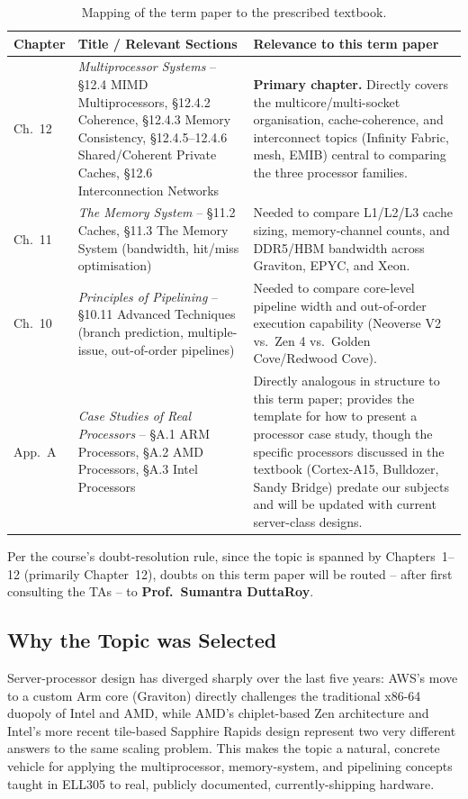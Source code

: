 \documentclass[11pt,a4paper]{article}
\begin{document}
\begin{table}[h]
\centering
\begin{tabular}{@{}p{2.6cm}p{5.6cm}p{6.4cm}@{}}
\toprule
\textbf{Chapter} & \textbf{Title / Relevant Sections} & \textbf{Relevance to this term paper} \\
\midrule
Ch.\ 12 & \emph{Multiprocessor Systems} --
  \S12.4 MIMD Multiprocessors, \S12.4.2 Coherence, \S12.4.3 Memory Consistency,
  \S12.4.5--12.4.6 Shared/Coherent Private Caches, \S12.6 Interconnection Networks &
  \textbf{Primary chapter.} Directly covers the multicore/multi-socket organisation,
  cache-coherence, and interconnect topics (Infinity Fabric, mesh, EMIB) central to comparing
  the three processor families. \\
Ch.\ 11 & \emph{The Memory System} --
  \S11.2 Caches, \S11.3 The Memory System (bandwidth, hit/miss optimisation) &
  Needed to compare L1/L2/L3 cache sizing, memory-channel counts, and DDR5/HBM
  bandwidth across Graviton, EPYC, and Xeon. \\
Ch.\ 10 & \emph{Principles of Pipelining} --
  \S10.11 Advanced Techniques (branch prediction, multiple-issue, out-of-order pipelines) &
  Needed to compare core-level pipeline width and out-of-order execution capability
  (Neoverse V2 vs.\ Zen 4 vs.\ Golden Cove/Redwood Cove). \\
App.\ A & \emph{Case Studies of Real Processors} --
  \S A.1 ARM Processors, \S A.2 AMD Processors, \S A.3 Intel Processors &
  Directly analogous in structure to this term paper; provides the template for how to
  present a processor case study, though the specific processors discussed in the textbook
  (Cortex-A15, Bulldozer, Sandy Bridge) predate our subjects and will be updated with current
  server-class designs. \\
\bottomrule
\end{tabular}
\caption{Mapping of the term paper to the prescribed textbook.}
\end{table}

\noindent Per the course's doubt-resolution rule, since the topic is spanned by
Chapters~1--12 (primarily Chapter~12), doubts on this term paper will be routed --
after first consulting the TAs -- to \textbf{Prof.\ Sumantra DuttaRoy}.

\subsection{Why the Topic was Selected}
Server-processor design has diverged sharply over the last five years: AWS's move to a custom
Arm core (Graviton) directly challenges the traditional x86-64 duopoly of Intel and AMD, while
AMD's chiplet-based Zen architecture and Intel's more recent tile-based Sapphire Rapids design
represent two very different answers to the same scaling problem. This makes the topic a
natural, concrete vehicle for applying the multiprocessor, memory-system, and pipelining
concepts taught in ELL305 to real, publicly documented, currently-shipping hardware.
\end{document}

